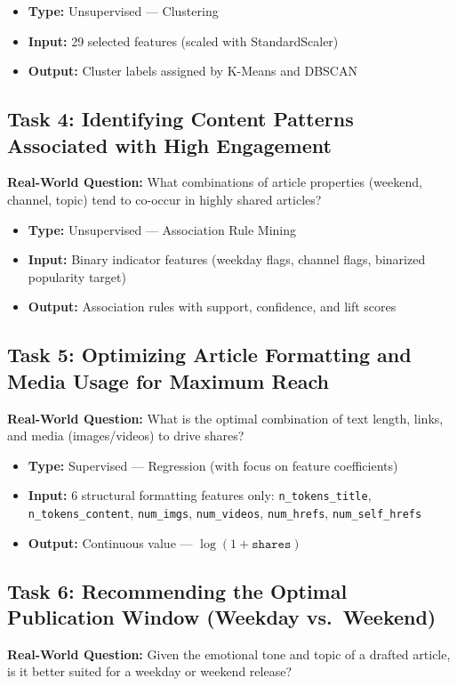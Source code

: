 \begin{itemize}[leftmargin=1.5em]
    \item \textbf{Type:} Unsupervised --- Clustering
    \item \textbf{Input:} 29 selected features (scaled with StandardScaler)
    \item \textbf{Output:} Cluster labels assigned by K-Means and DBSCAN
\end{itemize}

\subsection{Task 4: Identifying Content Patterns Associated with High Engagement}
\textbf{Real-World Question:} What combinations of article properties (weekend, channel, topic) tend to co-occur in highly shared articles?

\begin{itemize}[leftmargin=1.5em]
    \item \textbf{Type:} Unsupervised --- Association Rule Mining
    \item \textbf{Input:} Binary indicator features (weekday flags, channel flags, binarized popularity target)
    \item \textbf{Output:} Association rules with support, confidence, and lift scores
\end{itemize}

\subsection{Task 5: Optimizing Article Formatting and Media Usage for Maximum Reach}
\textbf{Real-World Question:} What is the optimal combination of text length, links, and media (images/videos) to drive shares?

\begin{itemize}[leftmargin=1.5em]
    \item \textbf{Type:} Supervised --- Regression (with focus on feature coefficients)
    \item \textbf{Input:} 6 structural formatting features only: \texttt{n\_tokens\_title}, \texttt{n\_tokens\_content}, \texttt{num\_imgs}, \texttt{num\_videos}, \texttt{num\_hrefs}, \texttt{num\_self\_hrefs}
    \item \textbf{Output:} Continuous value --- $\log(1 + \texttt{shares})$
\end{itemize}

\subsection{Task 6: Recommending the Optimal Publication Window (Weekday vs.\ Weekend)}
\textbf{Real-World Question:} Given the emotional tone and topic of a drafted article, is it better suited for a weekday or weekend release?

